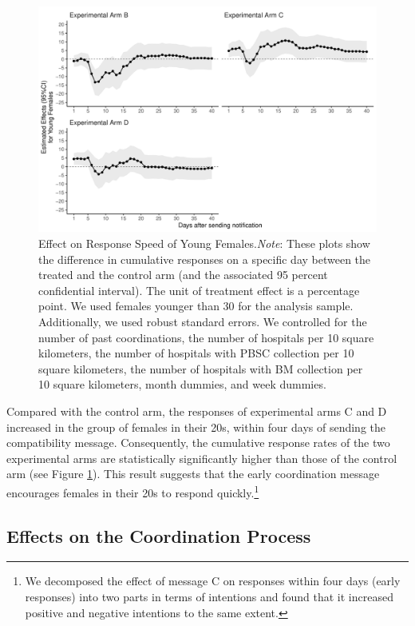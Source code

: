\documentclass[12pt, a4paper]{article}
\begin{document}
\begin{figure}[t]
\includegraphics{JMDP RCT - Main Document_files/figure-latex/young-female-flow-1} \caption{Effect on Response Speed of Young Females.\newline \emph{Note}: These plots show the difference in cumulative responses on a specific day between the treated and the control arm (and the associated 95 percent confidential interval). The unit of treatment effect is a percentage point. We used females younger than 30 for the analysis sample. Additionally, we used robust standard errors. We controlled for the number of past coordinations, the number of hospitals per 10 square kilometers, the number of hospitals with PBSC collection per 10 square kilometers, the number of hospitals with BM collection per 10 square kilometers, month dummies, and week dummies.}\label{fig:young-female-flow}
\end{figure}

Compared with the control arm, the responses of experimental arms C and D increased in the group of females in their 20s, within four days of sending the compatibility message. Consequently, the cumulative response rates of the two experimental arms are statistically significantly higher than those of the control arm (see Figure \ref{fig:young-female-flow}). This result suggests that the early coordination message encourages females in their 20s to respond quickly.\footnote{We decomposed the effect of message C on responses within four days (early responses) into two parts in terms of intentions and found that it increased positive and negative intentions to the same extent.}

\hypertarget{process}{%
\subsection{Effects on the Coordination Process}\label{process}}
\end{document}
